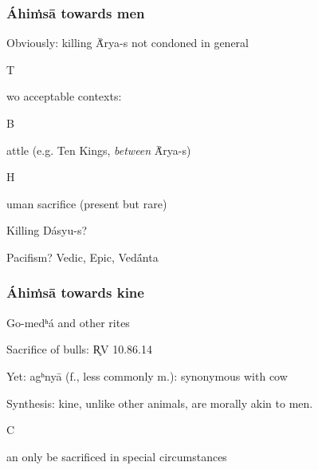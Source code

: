 \documentclass[pdf]{beamer}
\newcommand{\Subitem}[1]{{\setlength\itemindent{12pt} \item[-] #1}}
\newcommand{\Subsubitem}[1]{{\setlength\itemindent{24pt} \item[○] #1}}
\begin{document}
\begin{frame} \frametitle{Áhiṁsā towards men}
\begin{itemize}
	\item Obviously: killing Ā́rya-s not condoned in general
	\Subitem Two acceptable contexts:
	\Subsubitem Battle (e.g. Ten Kings, \emph{between} Ā́rya-s)
	\Subsubitem Human sacrifice (present but rare)
	\item Killing Dásyu-s?
	\item Pacifism? Vedic, Epic, Vedā́nta
\end{itemize}
\end{frame}

\begin{frame} \frametitle{Áhiṁsā towards kine}
\begin{itemize}
	\item Go-medʰá and other rites
	\item Sacrifice of bulls: R̥V 10.86.14
	\item Yet: agʰnyā (f., less commonly m.): synonymous with cow
	\item Synthesis: kine, unlike other animals, are morally akin to men.
	\Subitem Can only be sacrificed in special circumstances
\end{itemize}
\end{frame}

\end{document}

